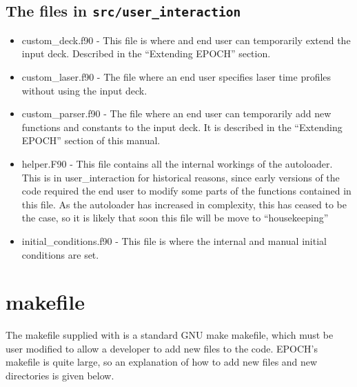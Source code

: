 \documentclass[12pt,a4paper]{article}
\newcommand{\inlinecode}[1]{{\color{warwickred} \bf\texttt{#1}}}
\newcommand{\EPOCH}{{\color{warwickdark}\fontfamily{phv}\selectfont{EPOCH}}}
\begin{document}
\subsection{The files in \inlinecode{src/user\_interaction}}
\begin{itemize}
\item custom\_deck.f90 - This file is where and end user can temporarily
  extend the input deck. Described in the ``Extending EPOCH'' section.
\item custom\_laser.f90 - The file where an end user specifies laser time
  profiles without using the input deck.
\item custom\_parser.f90 - The file where an end user can temporarily add new
  functions and constants to the input deck. It is described in the ``Extending
  EPOCH'' section of this manual.
\item helper.F90 - This file contains all the internal workings of the
  autoloader. This is in user\_interaction for historical reasons, since early
  versions of the code required the end user to modify some parts of the
  functions contained in this file. As the autoloader has increased in
  complexity, this has ceased to be the case, so it is likely that soon this
  file will be move to ``housekeeping''
\item initial\_conditions.f90 - This file is where the internal and manual
  initial conditions are set.
\end{itemize}

\section{{\EPOCH} makefile}
The makefile supplied with {\EPOCH} is a standard GNU make makefile, which must
be user modified to allow a developer to add new files to the code. EPOCH's
makefile is quite large, so an explanation of how to add new files and new
directories is given below.
\end{document}
